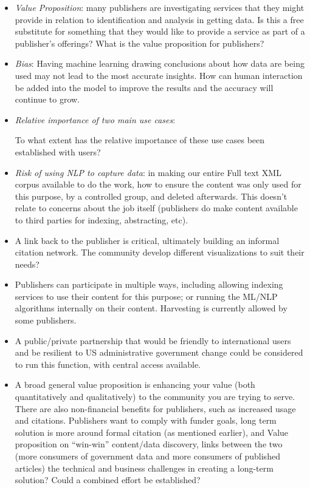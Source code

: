 \documentclass[titlepage, 11pt]{article}
\begin{document}
{\begin{itemize}
    \item \textit{Value Proposition}: many publishers are investigating services that they might provide in relation to identification and analysis in getting data. Is this a free substitute for something that they would like to provide a service as part of a publisher’s offerings? What is the value proposition for publishers? 
    \item \textit{Bias}: Having machine learning drawing conclusions about how data are being used may not lead to the most accurate insights. How can human interaction be added into the model to improve the results and the accuracy will continue to grow.
    \item \textit{Relative importance of two main use cases}:  To what extent has the relative importance of these use cases been established with users? 
    \item \textit{Risk of using NLP to capture data}: in making our entire Full text XML corpus available to do the work, how to ensure the content was only used for this purpose, by a controlled group, and deleted afterwards. This doesn’t relate to concerns about the job itself (publishers do make content available to third parties for indexing, abstracting, etc).
    \item A link back to the publisher is critical, ultimately building an informal citation network. The community develop different visualizations to suit their needs?
    \item Publishers can participate in multiple ways, including allowing indexing services to use their  content for this purpose; or running the ML/NLP algorithms internally on their content. Harvesting is currently allowed by some publishers.
    \item A public/private partnership that would be friendly to international users and be resilient to US administrative government change could be  considered to run this function, with central access available. 
    \item A broad general value proposition is enhancing your value (both quantitatively and qualitatively) to the community you are trying to serve. There are also non-financial benefits for publishers, such as increased usage and citations. Publishers want to comply with funder goals, long term solution is more around formal citation (as mentioned earlier), and Value proposition on “win-win” content/data discovery, links between the two (more consumers of government data and more consumers of published articles) the technical and business challenges in creating a long-term solution? Could a combined effort be established?

\end{itemize}}
\end{document}
